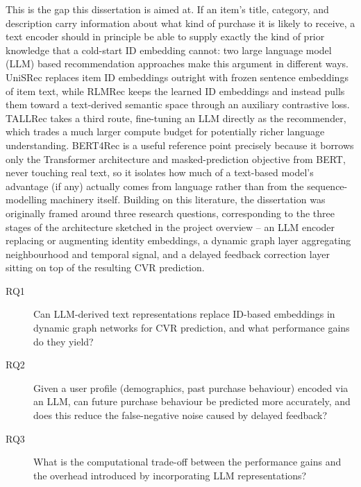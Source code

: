 \documentclass{uclthesis}
\begin{document}
This is the gap this dissertation is aimed at. If an item's title, category, and description carry information about what kind of purchase it is likely to receive, a text encoder should in principle be able to supply exactly the kind of prior knowledge that a cold-start ID embedding cannot: two large language model (LLM) based recommendation approaches make this argument in different ways. UniSRec \citep{hou2022unisrec} replaces item ID embeddings outright with frozen sentence embeddings of item text, while RLMRec \citep{ren2024rlmrec} keeps the learned ID embeddings and instead pulls them toward a text-derived semantic space through an auxiliary contrastive loss. TALLRec \citep{bao2023tallrec} takes a third route, fine-tuning an LLM directly as the recommender, which trades a much larger compute budget for potentially richer language understanding. BERT4Rec \citep{sun2019bert4rec} is a useful reference point precisely because it borrows only the Transformer architecture and masked-prediction objective from BERT, never touching real text, so it isolates how much of a text-based model's advantage (if any) actually comes from language rather than from the sequence-modelling machinery itself.
Building on this literature, the dissertation was originally framed around three research questions, corresponding to the three stages of the architecture sketched in the project overview -- an LLM encoder replacing or augmenting identity embeddings, a dynamic graph layer aggregating neighbourhood and temporal signal, and a delayed feedback correction layer sitting on top of the resulting CVR prediction.
\begin{description}
  \item[RQ1] Can LLM-derived text representations replace ID-based embeddings in dynamic graph networks for CVR prediction, and what performance gains do they yield?
  \item[RQ2] Given a user profile (demographics, past purchase behaviour) encoded via an LLM, can future purchase behaviour be predicted more accurately, and does this reduce the false-negative noise caused by delayed feedback?
  \item[RQ3] What is the computational trade-off between the performance gains and the overhead introduced by incorporating LLM representations?
\end{description}
\end{document}
